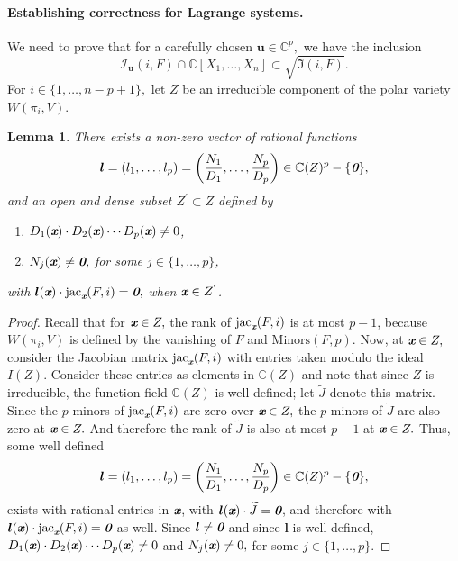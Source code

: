 \documentclass[a4paper]{article}
\def\bz{\textit{\textbf{0}}}
\def\ub{{\bm u}}
\def\lb{{\bm l}}
\def\xb{\textit{\textbf{x}}}
\def\jt{\widetilde{J}}
\DeclareMathOperator{\jac}{jac}
\def\minors{\textrm{Minors}(F,p)}
\def\C{\mathbb{C}}
\def\Wi{W(\pi_i,V)}
\def\Iir{\sqrt{\mathfrak{I}(i,F)}}
\def\ji{\jac_{\xb}(F,i)}
\def\Iil{\mathscr{I}_{\ub}(i,F)}
\newtheorem{lemma}[theorem]{Lemma}
\begin{document}
\paragraph*{Establishing correctness for Lagrange systems.}
%
We need to prove that for a carefully chosen $\ub \in \C^p,$ we have the inclusion 
\[\Iil \cap \C[X_1,\hdots,X_n] \subset \Iir.\] For $i \in \{1,\hdots,n-p+1\},$ let $Z$ be an irreducible component of the polar variety $\Wi$.
\begin{lemma}\label{lem:ratF}
There exists a non-zero vector of rational functions
\[\lb = (l_1,\hdots,l_p)=\left(\frac{N_1}{D_1},\hdots,\frac{N_p}{D_p}\right)\in \C(Z)^p-\{\bz\},\] 
and an open and dense subset $Z^{'} \subset Z$ defined by
\begin{enumerate}
    \item $D_1(\xb)\cdot D_2(\xb) \cdots D_p(\xb) \not = 0$,
    \item $N_j(\xb) \not = \bz,$ for some $j \in \{1,\hdots,p\}$, 
\end{enumerate}
with $\lb(\xb) \cdot \ji = \bz,$  when $\xb \in Z^{'}$.
%
%
\end{lemma}
%
\begin{proof}
Recall that for $\xb \in Z,$ the rank of $\ji$ is at most $p-1$, because $\Wi$ is defined by the vanishing of $F$ and $\minors$. Now,  at $\xb \in Z,$ consider the Jacobian matrix $\jac_{\xb}(F,i)$  with entries taken modulo the ideal $I(Z)$. Consider these entries as elements in $\C(Z)$ and note that since $Z$ is irreducible, the function field $\C(Z)$ is well defined; let $\jt$ denote this matrix.  Since the $p$-minors of $\ji$ are zero over $\xb \in Z,$ the $p$-minors of $\jt$ are also zero at $\xb \in Z.$ And therefore the rank of $\jt$ is also at most $p-1$ at $\xb \in Z.$ Thus, some well defined 
\[\lb = (l_1,\hdots,l_p)=\left(\frac{N_1}{D_1},\hdots,\frac{N_p}{D_p}\right)\in \C(Z)^p-\{\bz\},\]
\noindent 
exists with rational entries in $\xb$, with $\lb({\xb}) \cdot \jt = \bz$, and therefore with $\lb({\xb}) \cdot \ji = \bz$ as well. Since $\lb \not = \bz$ and since $\lb$ is well defined, $D_1(\xb)\cdot D_2(\xb) \cdots D_p(\xb) \not = 0$ and $N_j(\xb) \not = 0,$ for some $j \in \{1,\hdots,p\}$. 
\end{proof}
%
\end{document}
